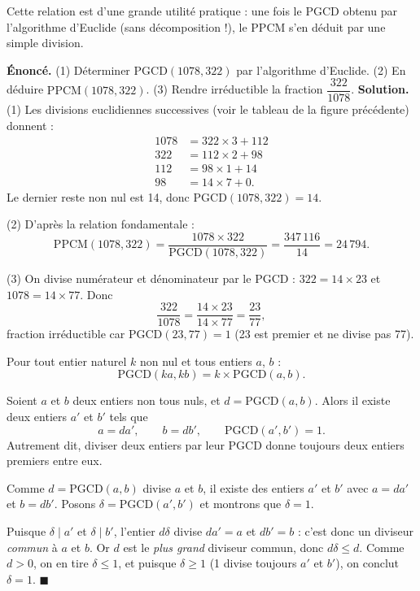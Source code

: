 \documentclass[11pt]{article}
\newcommand{\cle}[1]{{\popxbold\color{popdark}#1}}
\newcounter{popsec}
\newcounter{popsub}
\newcommand{\courssub}[1]{%
  \stepcounter{popsub}%
  \par\vspace{9pt}\noindent{\popxbold\fontsize{11.5}{13}\selectfont\color{popink}{\color{poporange}\thepopsec.\thepopsub}\hspace{6pt}#1}\par\nopagebreak\vspace{4pt}
}
\begin{document}
Cette relation est d'une grande utilité pratique : une fois le PGCD obtenu par l'algorithme d'Euclide (sans décomposition !), le PPCM s'en déduit par une simple division.

\begin{exoresolu}
\textbf{Énoncé.} (1) Déterminer $\mathrm{PGCD}(1078, 322)$ par l'algorithme d'Euclide. (2) En déduire $\mathrm{PPCM}(1078, 322)$. (3) Rendre irréductible la fraction $\dfrac{322}{1078}$.
\tcblower
\textbf{Solution.} (1) Les divisions euclidiennes successives (voir le tableau de la figure précédente) donnent :
\begin{align*}
1078 &= 322 \times 3 + 112 \\
322 &= 112 \times 2 + 98 \\
112 &= 98 \times 1 + 14 \\
98 &= 14 \times 7 + 0.
\end{align*}
Le dernier reste non nul est 14, donc $\mathrm{PGCD}(1078, 322) = 14$.

(2) D'après la relation fondamentale :
\[
\mathrm{PPCM}(1078, 322) = \frac{1078 \times 322}{\mathrm{PGCD}(1078, 322)} = \frac{347\,116}{14} = 24\,794.
\]

(3) On divise numérateur et dénominateur par le PGCD : $322 = 14 \times 23$ et $1078 = 14 \times 77$. Donc
\[
\frac{322}{1078} = \frac{14 \times 23}{14 \times 77} = \frac{23}{77},
\]
fraction irréductible car $\mathrm{PGCD}(23, 77) = 1$ (23 est premier et ne divise pas 77).
\end{exoresolu}

\courssub{Propriétés opératoires du PGCD}

\begin{propriete}
Pour tout entier naturel $k$ non nul et tous entiers $a$, $b$ :
\[
\mathrm{PGCD}(ka, kb) = k \times \mathrm{PGCD}(a, b).
\]
\end{propriete}

\begin{propriete}
Soient $a$ et $b$ deux entiers non tous nuls, et $d = \mathrm{PGCD}(a, b)$. Alors il existe deux entiers $a'$ et $b'$ tels que
\[
a = d a', \qquad b = d b', \qquad \mathrm{PGCD}(a', b') = 1.
\]
Autrement dit, diviser deux entiers par leur PGCD donne toujours deux entiers \cle{premiers entre eux}.
\end{propriete}

\begin{experience}
Comme $d = \mathrm{PGCD}(a, b)$ divise $a$ et $b$, il existe des entiers $a'$ et $b'$ avec $a = da'$ et $b = db'$. Posons $\delta = \mathrm{PGCD}(a', b')$ et montrons que $\delta = 1$.

Puisque $\delta \mid a'$ et $\delta \mid b'$, l'entier $d\delta$ divise $da' = a$ et $db' = b$ : c'est donc un diviseur \emph{commun} à $a$ et $b$. Or $d$ est le \emph{plus grand} diviseur commun, donc $d\delta \leqslant d$. Comme $d > 0$, on en tire $\delta \leqslant 1$, et puisque $\delta \geqslant 1$ (1 divise toujours $a'$ et $b'$), on conclut $\delta = 1$. $\blacksquare$
\end{experience}
\end{document}
